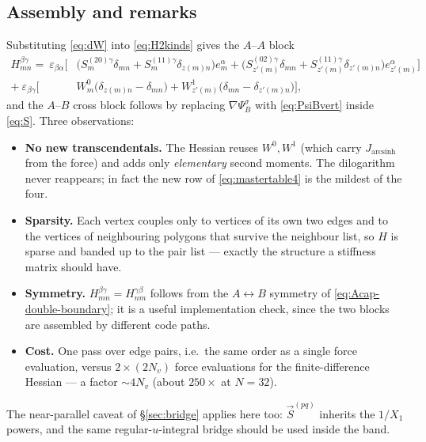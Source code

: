 \documentclass[11pt]{article}
\numberwithin{equation}{section}
\newcommand{\vv}[1]{\vec{#1}}
\newcommand{\eps}{\varepsilon}
\DeclareMathOperator{\arcsinh}{arcsinh}
\begin{document}
\subsection{Assembly and remarks}
Substituting \eqref{eq:dW} into \eqref{eq:H2kinds} gives the $A$--$A$ block
\begin{equation}\label{eq:HAA}
\begin{aligned}
  H^{\beta\gamma}_{mn}=\ \eps_{\beta\alpha}\Big[
    &\big(S_m^{(20)\gamma}\delta_{mn}+S_m^{(11)\gamma}\delta_{z(m)n}\big)e_m^\alpha
    +\big(S_{z'(m)}^{(02)\gamma}\delta_{mn}+S_{z'(m)}^{(11)\gamma}\delta_{z'(m)n}\big)e_{z'(m)}^\alpha\Big]\\
  +\ \eps_{\beta\gamma}\Big[&W_m^{0}\big(\delta_{z(m)n}-\delta_{mn}\big)
    +W_{z'(m)}^{1}\big(\delta_{mn}-\delta_{z'(m)n}\big)\Big],
\end{aligned}
\end{equation}
and the $A$--$B$ cross block follows by replacing $\nabla\Psi_B^\sigma$ with \eqref{eq:PsiBvert} inside
\eqref{eq:S}. Three observations:
\begin{itemize}
\item \textbf{No new transcendentals.} The Hessian reuses $W^{0},W^{1}$ (which carry $J_{\arcsinh}$ from
  the force) and adds only \emph{elementary} second moments. The dilogarithm never reappears; in fact
  the new row of \eqref{eq:mastertable4} is the mildest of the four.
\item \textbf{Sparsity.} Each vertex couples only to vertices of its own two edges and to the vertices
  of neighbouring polygons that survive the neighbour list, so $H$ is sparse and banded up to the
  pair list --- exactly the structure a stiffness matrix should have.
\item \textbf{Symmetry.} $H^{\beta\gamma}_{mn}=H^{\gamma\beta}_{nm}$ follows from the $A\!\leftrightarrow\!B$
  symmetry of \eqref{eq:Acap-double-boundary}; it is a useful implementation check, since the two
  blocks are assembled by different code paths.
\item \textbf{Cost.} One pass over edge pairs, i.e.\ the same order as a single force evaluation,
  versus $2\times(2N_v)$ force evaluations for the finite-difference Hessian --- a factor
  $\sim4N_v$ (about $250\times$ at $N=32$).
\end{itemize}
The near-parallel caveat of \S\ref{sec:bridge} applies here too: $\vv S^{(pq)}$ inherits the $1/X_1$
powers, and the same regular-$u$-integral bridge should be used inside the band.

\end{document}

